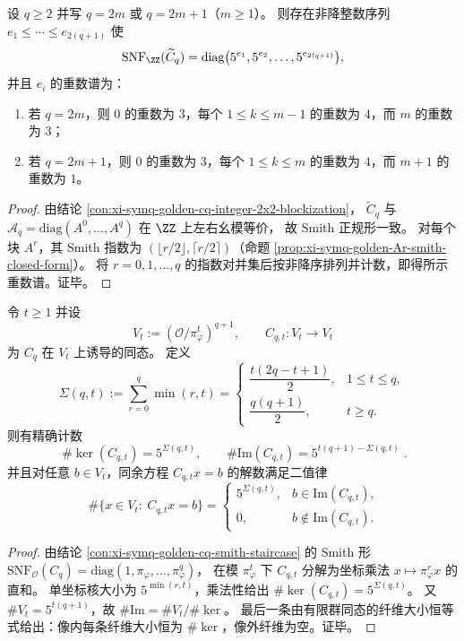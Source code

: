 \begin{corollary}\label{cor:xi-symq-golden-cq-integer-smith-multiplicity-spectrum}
设 \(q\ge 2\) 并写 \(q=2m\) 或 \(q=2m+1\)（\(m\ge 1\)）。
则存在非降整数序列 \(e_1\le\cdots\le e_{2(q+1)}\) 使
\[
\mathrm{SNF}_{\ZZ}(\widetilde C_q)=\mathrm{diag}\bigl(5^{e_1},5^{e_2},\dots,5^{e_{2(q+1)}}\bigr),
\]
并且 \(e_i\) 的重数谱为：
\begin{enumerate}
  \item 若 \(q=2m\)，则 \(0\) 的重数为 \(3\)，每个 \(1\le k\le m-1\) 的重数为 \(4\)，而 \(m\) 的重数为 \(3\)；
  \item 若 \(q=2m+1\)，则 \(0\) 的重数为 \(3\)，每个 \(1\le k\le m\) 的重数为 \(4\)，而 \(m+1\) 的重数为 \(1\)。
\end{enumerate}
\end{corollary}
\begin{proof}
由结论 \ref{con:xi-symq-golden-cq-integer-2x2-blockization}，
\(\widetilde C_q\) 与 \(\mathcal A_q=\mathrm{diag}(A^0,\dots,A^q)\) 在 \(\ZZ\) 上左右幺模等价，
故 Smith 正规形一致。
对每个块 \(A^r\)，其 Smith 指数为 \((\lfloor r/2\rfloor,\lceil r/2\rceil)\)（命题 \ref{prop:xi-symq-golden-Ar-smith-closed-form}）。
将 \(r=0,1,\dots,q\) 的指数对并集后按非降序排列并计数，即得所示重数谱。证毕。
\end{proof}

\begin{conclusion}\label{con:xi-symq-golden-cq-mod-pi-kernel-image-count}
令 \(t\ge 1\) 并设
\[
V_t:=(\mathcal O/\pi_\varphi^{t})^{q+1},
\qquad
C_{q,t}:V_t\to V_t
\]
为 \(C_q\) 在 \(V_t\) 上诱导的同态。
定义
\[
\Sigma(q,t):=\sum_{r=0}^{q}\min(r,t)
=
\begin{cases}
\dfrac{t(2q-t+1)}{2},& 1\le t\le q,\\[6pt]
\dfrac{q(q+1)}{2},& t\ge q.
\end{cases}
\]
则有精确计数
\[
\boxed{\;
\#\ker(C_{q,t})=5^{\Sigma(q,t)},\qquad
\#\mathrm{Im}(C_{q,t})=5^{t(q+1)-\Sigma(q,t)}\; }.
\]
并且对任意 \(b\in V_t\)，同余方程 \(C_{q,t}x=b\) 的解数满足二值律
\[
\boxed{\;
\#\{x\in V_t:\ C_{q,t}x=b\}=
\begin{cases}
5^{\Sigma(q,t)},& b\in\mathrm{Im}(C_{q,t}),\\
0,& b\notin\mathrm{Im}(C_{q,t}).
\end{cases}}
\]
\end{conclusion}
\begin{proof}
由结论 \ref{con:xi-symq-golden-cq-smith-staircase} 的 Smith 形
\(
\mathrm{SNF}_{\mathcal O}(C_q)=\mathrm{diag}(1,\pi_\varphi,\dots,\pi_\varphi^q)
\)，
在模 \(\pi_\varphi^t\) 下 \(C_{q,t}\) 分解为坐标乘法 \(x\mapsto \pi_\varphi^{r}x\) 的直和。
单坐标核大小为 \(5^{\min(r,t)}\)，乘法性给出 \(\#\ker(C_{q,t})=5^{\Sigma(q,t)}\)。
又 \(\#V_t=5^{t(q+1)}\)，故 \(\#\mathrm{Im}=\#V_t/\#\ker\)。
最后一条由有限群同态的纤维大小恒等式给出：像内每条纤维大小恒为 \(\#\ker\)，像外纤维为空。证毕。
\end{proof}

